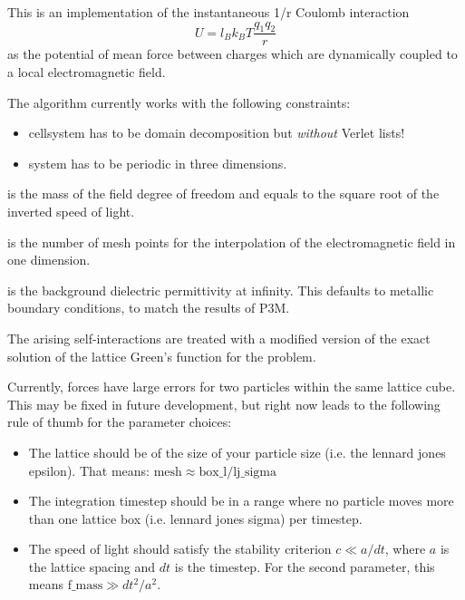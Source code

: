 This is an implementation of the instantaneous 1/r Coulomb interaction
\begin{equation}
  U = l_B k_B T \frac{q_1 q_2}{r}
\end{equation}
as the potential of mean force between charges which are dynamically
coupled to a local electromagnetic field.

The algorithm currently works with the following constraints:

\begin{itemize}
  \item cellsystem has to be domain decomposition but \emph{without}
    Verlet lists!
  \item system has to be periodic in three dimensions.
\end{itemize}

\begin{arguments}
\item[\var{f\_mass}] is the mass of the field degree of freedom and equals
  to the square root of the inverted speed of light.
\item[\var{mesh}] is the number of mesh points for the interpolation
  of the electromagnetic field in one dimension.
\item[\var{\varepsilon_{\infty}}] is the background dielectric
  permittivity at infinity. This defaults to metallic boundary
  conditions, to match the results of P3M.
\end{arguments}

The arising self-interactions are treated with a modified version of
the exact solution of the lattice Green's function for the
problem.

Currently, forces have large errors for two particles within the same
lattice cube. This may be fixed in future development, but right now
leads to the following rule of thumb for the parameter choices:

\begin{itemize}
  \item The lattice should be of the size of your particle size
    (i.e. the lennard jones epsilon). That means: $\text{mesh} \approx
    \text{box\_l} / \text{lj\_sigma}$
  \item The integration timestep should be in a range where no
    particle moves more than one lattice box (i.e. lennard jones
    sigma) per timestep.
  \item The speed of light should satisfy the stability criterion
    $c\ll a/dt$, where $a$ is the lattice spacing and $dt$ is the
    timestep. For the second parameter, this means $\text{f\_mass} \gg
    dt^2/a^2$.
\end{itemize}

